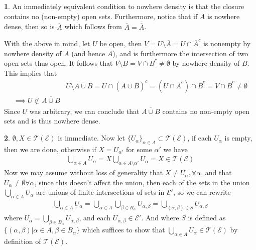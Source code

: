 \documentclass[10.5pt]{article}
\theoremstyle{definition}
\newtheorem{pb}{}
\newcommand{\set}[1]{\{#1\}}
\begin{document}
    \begin{pb}
        An immediately equivalent condition to nowhere density is that the closure contains no (non-empty) open sets. Furthermore, notice that if \(A\) is nowhere dense, then so is \(\overline{A}\) which follows from \(\overline{A} = \overline{\overline{A}}\).

        With the above in mind, let \(U\) be open, then \(V = U \setminus \overline{A} = U \cap \overline{A}^c\) is nonempty by nowhere density of \(A\) (and hence \(\overline{A}\)), and is furthermore the intersection of two open sets thus open. It follows that \(V \setminus \overline{B} = V \cap \overline{B}^c \neq \emptyset\) by nowhere density of \(B\). This implies that
        \begin{align*}
            &U \setminus \overline{A\cup B} = U \cap (\overline{A}\cup \overline{B})^c = (U \cap \overline{A}^c) \cap \overline{B}^c = V \cap \overline{B}^c \neq \emptyset \\
            \implies U \not \subset \overline{A\cup B}
        \end{align*}
        Since \(U\) was arbitrary, we can conclude that \(\overline{A\cup B}\) contains no non-empty open sets and is thus nowhere dense.
    \end{pb}
    \begin{pb}
        \(\emptyset, X \in \mathcal{T}(\mathcal{E})\) is immediate. Now let \(\set{U_\alpha}_{\alpha\in A} \subset \mathcal{T}(\mathcal{E})\), if each \(U_\alpha\) is empty, then we are done, otherwise if \(X = U_{\alpha'}\) for some \(\alpha'\) we have 
        \begin{align*}
            \bigcup_{\alpha \in A}U_\alpha = X \bigcup_{\alpha \in A \setminus \alpha'} U_\alpha = X \in \mathcal{T}(\mathcal{E})
        \end{align*}
        Now we may assume without loss of generality that \(X \neq U_\alpha, \forall \alpha\), and that \(U_\alpha \neq \emptyset \forall \alpha\), since this doesn't affect the union, then
        each of the sets in the union \(\bigcup_{\alpha\in A}U_\alpha\) are unions of finite intersections of sets in \(\mathcal{E}'\), so we can rewrite
        \begin{align*}
            \bigcup_{\alpha \in A}U_\alpha = \bigcup_{\alpha \in A} \bigcup_{\beta \in B_\alpha} U_{\alpha,\beta} = \bigcup_{(\alpha,\beta) \in S} U_{\alpha,\beta}
        \end{align*}
        where \(U_\alpha = \bigcup_{\beta \in B_\alpha} U_{\alpha,\beta}\), and each \(U_{\alpha,\beta} \in \mathcal{E}'\). And where \(S\) is defined as \(\set{(\alpha,\beta) \vert \alpha \in A, \beta \in B_\alpha}\) which suffices to show that \(\bigcup_{\alpha \in A} U_\alpha \in \mathcal{T}(\mathcal{E})\) by definition of \(\mathcal{T}(\mathcal{E})\).
        
        
    \end{pb}
\end{document}
